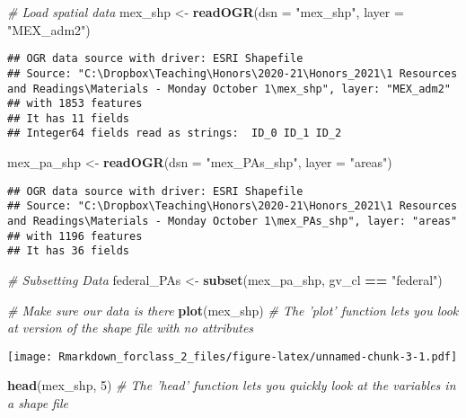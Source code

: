 \documentclass[
]{article}
\newenvironment{Shaded}{\begin{snugshade}}{\end{snugshade}}
\newcommand{\CommentTok}[1]{\textcolor[rgb]{0.56,0.35,0.01}{\textit{#1}}}
\newcommand{\DataTypeTok}[1]{\textcolor[rgb]{0.13,0.29,0.53}{#1}}
\newcommand{\DecValTok}[1]{\textcolor[rgb]{0.00,0.00,0.81}{#1}}
\newcommand{\KeywordTok}[1]{\textcolor[rgb]{0.13,0.29,0.53}{\textbf{#1}}}
\newcommand{\NormalTok}[1]{#1}
\newcommand{\OperatorTok}[1]{\textcolor[rgb]{0.81,0.36,0.00}{\textbf{#1}}}
\newcommand{\StringTok}[1]{\textcolor[rgb]{0.31,0.60,0.02}{#1}}
\begin{document}
\begin{Shaded}
\begin{Highlighting}[]
\CommentTok{# Load spatial data }
\NormalTok{mex_shp <-}\StringTok{ }\KeywordTok{readOGR}\NormalTok{(}\DataTypeTok{dsn =} \StringTok{"mex_shp"}\NormalTok{,}
                 \DataTypeTok{layer =} \StringTok{"MEX_adm2"}\NormalTok{) }
\end{Highlighting}
\end{Shaded}

\begin{verbatim}
## OGR data source with driver: ESRI Shapefile 
## Source: "C:\Dropbox\Teaching\Honors\2020-21\Honors_2021\1 Resources and Readings\Materials - Monday October 1\mex_shp", layer: "MEX_adm2"
## with 1853 features
## It has 11 fields
## Integer64 fields read as strings:  ID_0 ID_1 ID_2
\end{verbatim}

\begin{Shaded}
\begin{Highlighting}[]
\NormalTok{mex_pa_shp <-}\StringTok{  }\KeywordTok{readOGR}\NormalTok{(}\DataTypeTok{dsn =} \StringTok{"mex_PAs_shp"}\NormalTok{,}
                 \DataTypeTok{layer =} \StringTok{"areas"}\NormalTok{) }
\end{Highlighting}
\end{Shaded}

\begin{verbatim}
## OGR data source with driver: ESRI Shapefile 
## Source: "C:\Dropbox\Teaching\Honors\2020-21\Honors_2021\1 Resources and Readings\Materials - Monday October 1\mex_PAs_shp", layer: "areas"
## with 1196 features
## It has 36 fields
\end{verbatim}

\begin{Shaded}
\begin{Highlighting}[]
\CommentTok{# Subsetting Data }
\NormalTok{federal_PAs <-}\StringTok{ }\KeywordTok{subset}\NormalTok{(mex_pa_shp, gv_cl }\OperatorTok{==}\StringTok{ "federal"}\NormalTok{)}

\CommentTok{# Make sure our data is there }
\KeywordTok{plot}\NormalTok{(mex_shp) }\CommentTok{# The 'plot' function lets you look at version of the shape file with no attributes}
\end{Highlighting}
\end{Shaded}

\texttt{[image: Rmarkdown\_forclass\_2\_files/figure-latex/unnamed-chunk-3-1.pdf]}

\begin{Shaded}
\begin{Highlighting}[]
\KeywordTok{head}\NormalTok{(mex_shp, }\DecValTok{5}\NormalTok{) }\CommentTok{# The 'head' function lets you quickly look at the variables in a shape file }
\end{Highlighting}
\end{Shaded}
\end{document}
